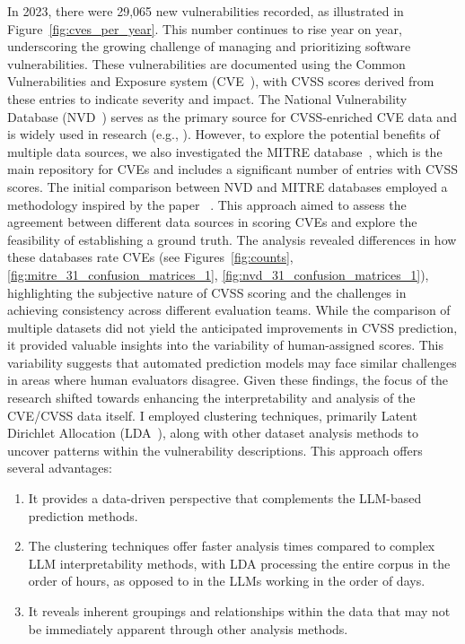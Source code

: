 \documentclass[12pt]{article}
\begin{document}
In 2023, there were 29,065 new vulnerabilities recorded, as illustrated in
Figure~\ref{fig:cves_per_year}. This number continues to rise year on year, underscoring the growing
challenge of managing and prioritizing software vulnerabilities. These vulnerabilities are
documented using the Common Vulnerabilities and Exposure system (CVE~\cite{CVE}), with CVSS scores
derived from these entries to indicate severity and impact. The National Vulnerability Database
(NVD~\cite{NVD}) serves as the primary source for CVSS-enriched CVE data and is widely used in
research (e.g., \cite{costa, nvd_example1, nvd_example2}). However, to explore the potential
benefits of multiple data sources, we also investigated the MITRE database~\cite{MITRE}, which is
the main repository for CVEs and includes a significant number of entries with CVSS scores. The
initial comparison between NVD and MITRE databases employed a methodology inspired by the paper
~\cite{bayes}. This
approach aimed to assess the agreement between different data sources in scoring CVEs and explore
the feasibility of establishing a ground truth. The analysis revealed differences in how these
databases rate CVEs (see Figures~\ref{fig:counts}, \ref{fig:mitre_31_confusion_matrices_1},
\ref{fig:nvd_31_confusion_matrices_1}), highlighting the subjective nature of CVSS scoring and the
challenges in achieving consistency across different evaluation teams. While the comparison of
multiple datasets did not yield the anticipated improvements in CVSS prediction, it provided
valuable insights into the variability of human-assigned scores. This variability suggests that
automated prediction models may face similar challenges in areas where human evaluators disagree.
Given these findings, the focus of the research shifted towards enhancing the interpretability and
analysis of the CVE/CVSS data itself. I employed clustering techniques, primarily Latent Dirichlet
Allocation (LDA~\cite{lda_origin}), along with other dataset analysis methods to uncover patterns
within the vulnerability descriptions. This approach offers several advantages:

\begin{enumerate}

	\item It provides a data-driven perspective that complements the LLM-based prediction methods.

	\item The clustering techniques offer faster analysis times compared to complex LLM interpretability
	      methods, with LDA processing the entire corpus in the order of hours, as opposed to in
	      the LLMs working in the order of days.

	\item It reveals inherent groupings and relationships within the data that may not be immediately apparent
	      through other analysis methods.

\end{enumerate}
\end{document}
